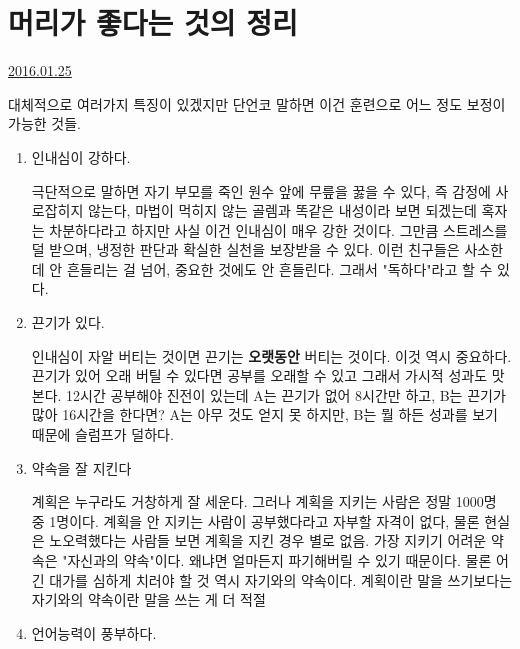 \section{머리가 좋다는 것의 정리}
\href{https://www.kockoc.com/Apoc/608996}{2016.01.25}

\vspace{5mm}

대체적으로 여러가지 특징이 있겠지만
단언코 말하면 이건 훈련으로 어느 정도 보정이 가능한 것들.
\vspace{5mm}
\begin{enumerate}
    \item 인내심이 강하다.
    \vspace{5mm}

    극단적으로 말하면 자기 부모를 죽인 원수 앞에 무릎을 꿇을 수 있다,
    즉 감정에 사로잡히지 않는다, 마법이 먹히지 않는 골렘과 똑같은 내성이라 보면 되겠는데
    혹자는 차분하다라고 하지만 사실 이건 인내심이 매우 강한 것이다.
    그만큼 스트레스를 덜 받으며, 냉정한 판단과 확실한 실천을 보장받을 수 있다.
    이런 친구들은 사소한 데 안 흔들리는 걸 넘어, 중요한 것에도 안 흔들린다.
    그래서 "독하다"라고 할 수 있다.
    \vspace{5mm}

    \item 끈기가 있다.
    \vspace{5mm}

    인내심이 자알 버티는 것이면 끈기는 \textbf{오랫동안} 버티는 것이다.
    이것 역시 중요하다. 끈기가 있어 오래 버틸 수 있다면 공부를 오래할 수 있고 그래서 가시적 성과도 맛본다.
    12시간 공부해야 진전이 있는데 A는 끈기가 없어 8시간만 하고, B는 끈기가 많아 16시간을 한다면?
    A는 아무 것도 얻지 못 하지만, B는 뭘 하든 성과를 보기 때문에 슬럼프가 덜하다.
    \vspace{5mm}

    \item 약속을 잘 지킨다
    \vspace{5mm}

    계획은 누구라도 거창하게 잘 세운다. 그러나 계획을 지키는 사람은 정말 1000명 중 1명이다.
    계획을 안 지키는 사람이 공부했다라고 자부할 자격이 없다, 물론 현실은 노오력했다는 사람들 보면 계획을 지킨 경우 별로 없음.
    가장 지키기 어려운 약속은 "자신과의 약속"이다. 왜냐면 얼마든지 파기해버릴 수 있기 때문이다.
    물론 어긴 대가를 심하게 치러야 할 것 역시 자기와의 약속이다.
    계획이란 말을 쓰기보다는 자기와의 약속이란 말을 쓰는 게 더 적절
    \vspace{5mm}

    \item 언어능력이 풍부하다.
    \vspace{5mm}


\end{enumerate}
